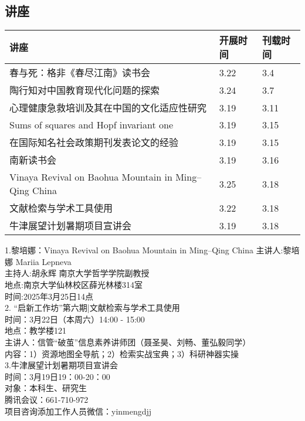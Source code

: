 \documentclass[letterpaper, 12pt]{article}
\begin{document}
\begin{multicols}{2}
\pagebreak

\section{讲座}
\begin{tabular}{|>{\centering\arraybackslash}m{}|m{}|m{}|}
    \hline
    讲座 & 开展时间 & 刊载时间\\
    \hline\hline
    春与死：格非《春尽江南》读书会 & 3.22 & 3.4\\\hline
    陶行知对中国教育现代化问题的探索 & 3.24 & 3.7\\\hline
    心理健康急救培训及其在中国的文化适应性研究 & 3.19 & 3.11\\\hline
    Sums of squares and Hopf invariant one & 3.19 & 3.15\\\hline
    在国际知名社会政策期刊发表论文的经验 & 3.19 & 3.15\\\hline
    南新读书会 & 3.19 & 3.16\\\hline
    Vinaya Revival on Baohua Mountain in Ming–Qing China & 3.25 & 3.18 \\\hline
    文献检索与学术工具使用 & 3.22 & 3.18\\\hline
    牛津展望计划暑期项目宣讲会 & 3.19 & 3.18\\\hline
\end{tabular}
1.黎培娜：Vinaya Revival on Baohua Mountain in Ming–Qing China
主讲人:黎培娜 Mariia Lepneva\\
主持人:胡永辉 南京大学哲学学院副教授\\
地点:南京大学仙林校区薛光林楼314室\\
时间:2025年3月25日14点\\
2. “启新工作坊”第六期|文献检索与学术工具使用\\
时间：3月22日（本周六）14:00 - 15:00\\
地点：教学楼121\\
主讲人：信管“破茧”信息素养讲师团（聂圣昊、刘畅、董弘毅同学）\\
内容：1）资源地图全导航；2）检索实战宝典；3）科研神器实操\\

3.牛津展望计划暑期项目宣讲会\\
时间：3月19日19：00-20：00\\
对象：本科生、研究生\\
腾讯会议：661-710-972\\
项目咨询添加工作人员微信：yinmengdjj\\


\end{multicols}
\end{document}
